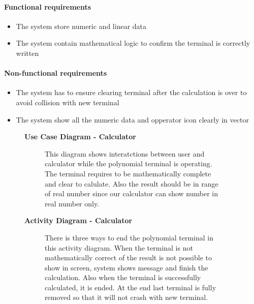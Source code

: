 \documentclass{article}
\begin{document}
		\paragraph{Functional requirements}
		\begin{itemize}
			\item The system store numeric and linear data
			\item The system contain mathematical logic to confirm the terminal is correctly written
		\end{itemize}
		
		\paragraph{Non-functional requirements}
		\begin{itemize}
			\item The system has to ensure clearing terminal after the calculation is over to avoid collision with new terminal
			\item The system show all the numeric data and opperator icon clearly in vector
		\end{itemize}
		\newpage
		
		\begin{figure}[htbp]
			\textbf{Use Case Diagram - Calculator}
			\centering
			\begin{subfigure}{\textwidth}
				\resizebox{\textwidth}{!}{}
			\end{subfigure}
			\begin{subfigure}{\textwidth}
				This diagram shows interatctions between user and calculator while the polynomial terminal is operating. The terminal requires to be mathematically complete and clear to calulate. Also the result should be in range of real number since our calculator can show number in real number only.
			\end{subfigure}
		\end{figure}
		\clearpage
		
		\begin{figure}[htbp]
			\textbf{Activity Diagram - Calculator}
			\centering
			\begin{subfigure}{\textwidth}
				\centering
				\scalebox{1.0}{}
			\end{subfigure}
			\begin{subfigure}{\textwidth}
				There is three ways to end the polynomial terminal in this activity diagram. When the terminal is not mathematically correct of the result is not possible to show in screen, system shows message and finish the calculation. Also when the terminal is successfully calculated, it is ended. At the end last terminal is fully removed so that it will not crash with new terminal.
			\end{subfigure}
		\end{figure}
		\clearpage
		
\end{document}
